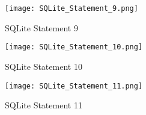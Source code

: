 \documentclass{article}
\begin{document}
\begin{figure}
    \centering
    \texttt{[image: SQLite\_Statement\_9.png]}
    \caption{SQLite Statement 9}
    \label{fig:enter-label}
\end{figure}

\begin{figure}
    \centering
    \texttt{[image: SQLite\_Statement\_10.png]}
    \caption{SQLite Statement 10}
    \label{fig:enter-label}
\end{figure}

\begin{figure}
    \centering
    \texttt{[image: SQLite\_Statement\_11.png]}
    \caption{SQLite Statement 11}
    \label{fig:enter-label}
\end{figure}
\end{document}
